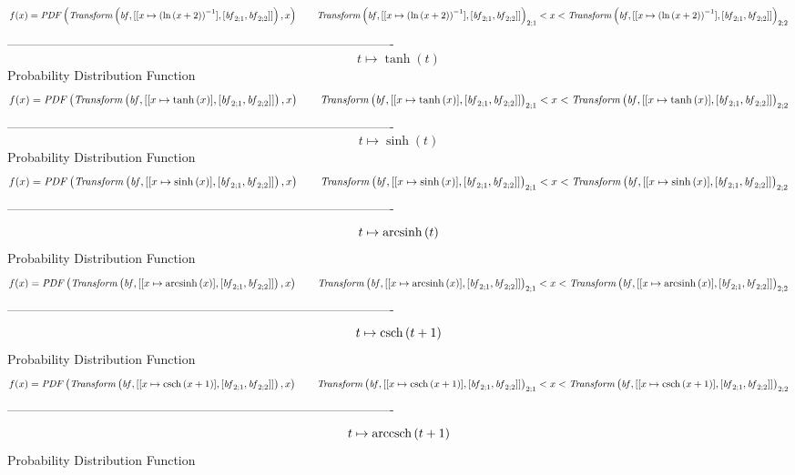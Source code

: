 \documentclass[12pt]{article}
\begin{document}
$$  f(x)={\it PDF} \left( {\it Transform} \left( {\it bf},[[x\mapsto  \left( 
\ln  \left( x+2 \right)  \right) ^{-1}],[{\it bf}_{2;{1}},{\it bf}_{2;
{2}}]] \right) ,x \right) 
 \qquad{\it Transform} \left( {\it bf},[[x\mapsto  \left( \ln  \left( x+2
 \right)  \right) ^{-1}],[{\it bf}_{2;{1}},{\it bf}_{2;{2}}]] \right) 
_{2;{1}}
 < x < {\it Transform} \left( {\it bf},[[x\mapsto  \left( \ln  \left( x+2
 \right)  \right) ^{-1}],[{\it bf}_{2;{1}},{\it bf}_{2;{2}}]] \right) 
_{2;{2}}
$$-------------------------------------------------------------------------------------------  \\$$t\mapsto \tanh \left( t \right) 
$$Probability Distribution Function 
$$  f(x)={\it PDF} \left( {\it Transform} \left( {\it bf},[[x\mapsto \tanh
 \left( x \right) ],[{\it bf}_{2;{1}},{\it bf}_{2;{2}}]] \right) ,x
 \right) 
 \qquad{\it Transform} \left( {\it bf},[[x\mapsto \tanh \left( x \right) ],[{
\it bf}_{2;{1}},{\it bf}_{2;{2}}]] \right) _{2;{1}}
 < x < {\it Transform} \left( {\it bf},[[x\mapsto \tanh \left( x \right) ],[{
\it bf}_{2;{1}},{\it bf}_{2;{2}}]] \right) _{2;{2}}
$$-------------------------------------------------------------------------------------------  \\$$t\mapsto \sinh \left( t \right) 
$$Probability Distribution Function 
$$  f(x)={\it PDF} \left( {\it Transform} \left( {\it bf},[[x\mapsto \sinh
 \left( x \right) ],[{\it bf}_{2;{1}},{\it bf}_{2;{2}}]] \right) ,x
 \right) 
 \qquad{\it Transform} \left( {\it bf},[[x\mapsto \sinh \left( x \right) ],[{
\it bf}_{2;{1}},{\it bf}_{2;{2}}]] \right) _{2;{1}}
 < x < {\it Transform} \left( {\it bf},[[x\mapsto \sinh \left( x \right) ],[{
\it bf}_{2;{1}},{\it bf}_{2;{2}}]] \right) _{2;{2}}
$$-------------------------------------------------------------------------------------------  \\$$t\mapsto {\rm arcsinh} \left(t\right)
$$Probability Distribution Function 
$$  f(x)={\it PDF} \left( {\it Transform} \left( {\it bf},[[x\mapsto 
{\rm arcsinh} \left(x\right)],[{\it bf}_{2;{1}},{\it bf}_{2;{2}}]]
 \right) ,x \right) 
 \qquad{\it Transform} \left( {\it bf},[[x\mapsto {\rm arcsinh} \left(x
\right)],[{\it bf}_{2;{1}},{\it bf}_{2;{2}}]] \right) _{2;{1}}
 < x < {\it Transform} \left( {\it bf},[[x\mapsto {\rm arcsinh} \left(x
\right)],[{\it bf}_{2;{1}},{\it bf}_{2;{2}}]] \right) _{2;{2}}
$$-------------------------------------------------------------------------------------------  \\$$t\mapsto {\rm csch} \left(t+1\right)
$$Probability Distribution Function 
$$  f(x)={\it PDF} \left( {\it Transform} \left( {\it bf},[[x\mapsto {\rm csch}
 \left(x+1\right)],[{\it bf}_{2;{1}},{\it bf}_{2;{2}}]] \right) ,x
 \right) 
 \qquad{\it Transform} \left( {\it bf},[[x\mapsto {\rm csch} \left(x+1\right)
],[{\it bf}_{2;{1}},{\it bf}_{2;{2}}]] \right) _{2;{1}}
 < x < {\it Transform} \left( {\it bf},[[x\mapsto {\rm csch} \left(x+1\right)
],[{\it bf}_{2;{1}},{\it bf}_{2;{2}}]] \right) _{2;{2}}
$$-------------------------------------------------------------------------------------------  \\$$t\mapsto {\rm arccsch} \left(t+1\right)
$$Probability Distribution Function 
\end{document}
